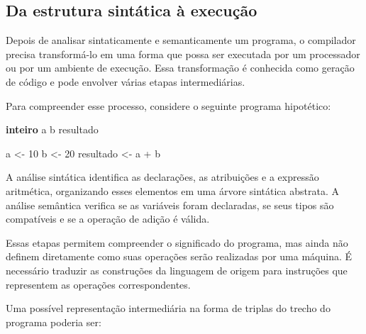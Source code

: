 \documentclass[
  brazilian,
  letterpaper,
]{book}
\newenvironment{Shaded}{\begin{snugshade}}{\end{snugshade}}
\newcommand{\DecValTok}[1]{\textcolor[rgb]{0.68,0.00,0.00}{#1}}
\newcommand{\KeywordTok}[1]{\textcolor[rgb]{0.00,0.23,0.31}{\textbf{#1}}}
\newcommand{\NormalTok}[1]{\textcolor[rgb]{0.00,0.23,0.31}{#1}}
\theoremstyle{plain}
\theoremstyle{definition}
\theoremstyle{remark}
\begin{document}
\subsection{Da estrutura sintática à
execução}\label{da-estrutura-sintuxe1tica-uxe0-execuuxe7uxe3o}

Depois de analisar sintaticamente e semanticamente um programa, o
compilador precisa transformá-lo em uma forma que possa ser executada
por um processador ou por um ambiente de execução. Essa transformação é
conhecida como geração de código e pode envolver várias etapas
intermediárias.

Para compreender esse processo, considere o seguinte programa
hipotético:

\begin{Shaded}
\begin{Highlighting}[]
\KeywordTok{inteiro}\NormalTok{ a b resultado}

\NormalTok{a \textless{}{-} }\DecValTok{10}
\NormalTok{b \textless{}{-} }\DecValTok{20}
\NormalTok{resultado \textless{}{-} a + b}
\end{Highlighting}
\end{Shaded}

A análise sintática identifica as declarações, as atribuições e a
expressão aritmética, organizando esses elementos em uma árvore
sintática abstrata. A análise semântica verifica se as variáveis foram
declaradas, se seus tipos são compatíveis e se a operação de adição é
válida.

Essas etapas permitem compreender o significado do programa, mas ainda
não definem diretamente como suas operações serão realizadas por uma
máquina. É necessário traduzir as construções da linguagem de origem
para instruções que representem as operações correspondentes.

Uma possível representação intermediária na forma de triplas do trecho
do programa poderia ser:
\end{document}
